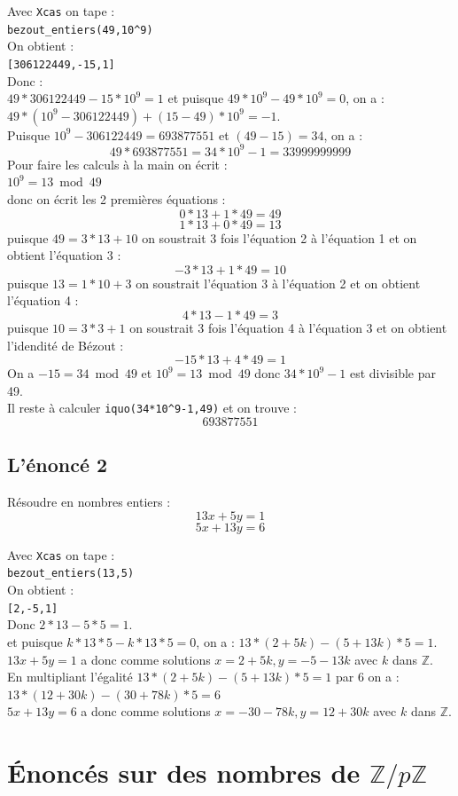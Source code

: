 \documentclass[a4paper,11pt]{book}
\newcommand{\Z}{{\mathbb{Z}}}
\begin{document}
Avec {\tt Xcas} on tape :\\
{\tt bezout\_entiers(49,10\verb|^|9)}\\
On obtient :\\
{\tt [306122449,-15,1]}\\
Donc :\\
$49*306122449-15*10^9=1$
et puisque $49*10^9-49*10^9=0$, on a :\\
$49*(10^9-306122449)+(15-49)*10^9=-1$.\\
Puisque $10^9-306122449=693877551$ et $(49-15)=34$, on a :
$$49*693877551=34*10^9-1=33999999999$$
Pour faire les calculs \`a la main on \'ecrit :\\
$10^9=13 \bmod 49$\\
donc on \'ecrit les 2 premi\`eres \'equations :
$$0*13+1*49=49$$
$$1*13+0*49=13$$
puisque $49=3*13+10$ on soustrait 3 fois l'\'equation 2 \`a l'\'equation 1 et
on obtient l'\'equation 3 :
$$-3*13+1*49=10$$
puisque $13=1*10+3$ on soustrait l'\'equation 3 \`a l'\'equation 2 et
on obtient l'\'equation 4 :
$$4*13-1*49=3$$
puisque $10=3*3+1$ on soustrait  3 fois l'\'equation 4 \`a l'\'equation 3 et
on obtient l'idendit\'e de B\'ezout :
$$-15*13+4*49=1$$
On a $-15=34 \bmod 49$ et $10^9=13 \bmod 49$ donc
$34*10^9-1$ est divisible par 49.\\
Il reste \`a calculer {\tt iquo(34*10\verb|^|9-1,49)} et on 
trouve :
$$693877551$$ 
\subsection{L'\'enonc\'e 2}
R\'esoudre en nombres entiers :
$$13x+5y=1$$
$$5x+13y=6$$

Avec {\tt Xcas} on tape :\\
{\tt bezout\_entiers(13,5)}\\
On obtient :\\
{\tt [2,-5,1]}\\
Donc $2*13-5*5=1$.\\
et puisque $k*13*5-k*13*5=0$, on a :
$13*(2+5k)-(5+13k)*5=1$.\\ 
$13x+5y=1$ a donc comme solutions $x=2+5k,y=-5-13k$ avec $k$ dans $\Z$.\\
En multipliant l'\'egalit\'e $13*(2+5k)-(5+13k)*5=1$ par 6 on a :\\
$13*(12+30k)-(30+78k)*5=6$\\
$5x+13y=6$ a donc comme solutions $x=-30-78k,y=12+30k$ avec $k$ dans $\Z$.

\section{\'Enonc\'es sur des nombres de $\Z/p\Z$}
\end{document}
